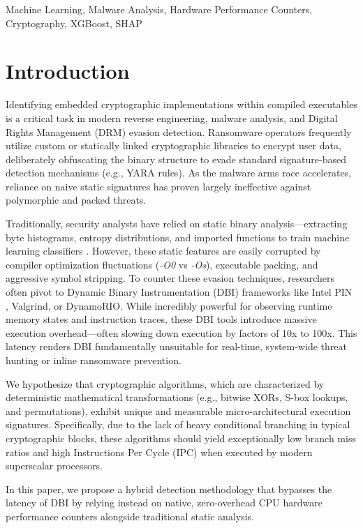 \documentclass[conference]{IEEEtran}
\begin{document}
\begin{IEEEkeywords}
Machine Learning, Malware Analysis, Hardware Performance Counters, Cryptography, XGBoost, SHAP
\end{IEEEkeywords}

\section{Introduction}
Identifying embedded cryptographic implementations within compiled executables is a critical task in modern reverse engineering, malware analysis, and Digital Rights Management (DRM) evasion detection. Ransomware operators frequently utilize custom or statically linked cryptographic libraries to encrypt user data, deliberately obfuscating the binary structure to evade standard signature-based detection mechanisms (e.g., YARA rules). As the malware arms race accelerates, reliance on naive static signatures has proven largely ineffective against polymorphic and packed threats.

Traditionally, security analysts have relied on static binary analysis---extracting byte histograms, entropy distributions, and imported functions to train machine learning classifiers \cite{anderson2018ember}. However, these static features are easily corrupted by compiler optimization fluctuations (\textit{-O0} vs \textit{-Os}), executable packing, and aggressive symbol stripping. To counter these evasion techniques, researchers often pivot to Dynamic Binary Instrumentation (DBI) frameworks like Intel PIN \cite{luk2005pin}, Valgrind, or DynamoRIO. While incredibly powerful for observing runtime memory states and instruction traces, these DBI tools introduce massive execution overhead---often slowing down execution by factors of 10x to 100x. This latency renders DBI fundamentally unsuitable for real-time, system-wide threat hunting or inline ransomware prevention.

We hypothesize that cryptographic algorithms, which are characterized by deterministic mathematical transformations (e.g., bitwise XORs, S-box lookups, and permutations), exhibit unique and measurable micro-architectural execution signatures. Specifically, due to the lack of heavy conditional branching in typical cryptographic blocks, these algorithms should yield exceptionally low branch miss ratios and high Instructions Per Cycle (IPC) when executed by modern superscalar processors. 

In this paper, we propose a hybrid detection methodology that bypasses the latency of DBI by relying instead on native, zero-overhead CPU hardware performance counters alongside traditional static analysis. 
\end{document}
